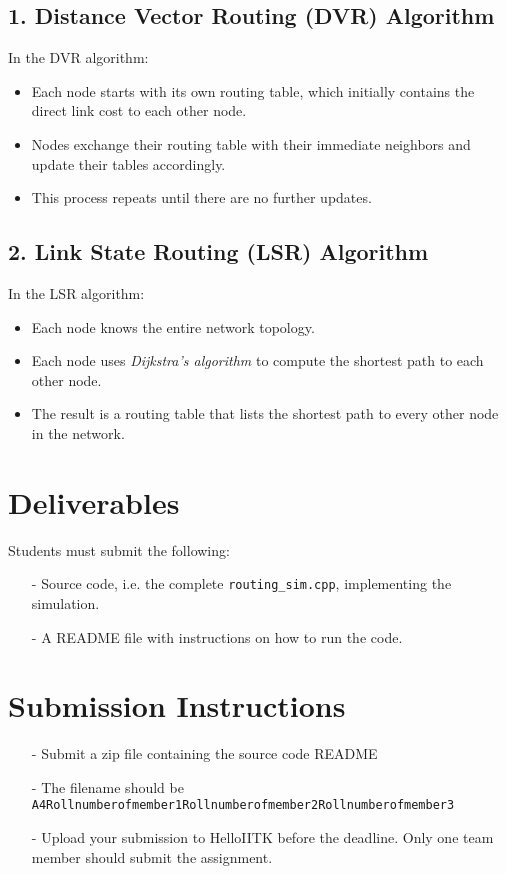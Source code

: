 \documentclass[12pt,a4paper]{article}
\begin{document}
\subsection*{1. Distance Vector Routing (DVR) Algorithm}
In the DVR algorithm:
\begin{itemize}
    \item Each node starts with its own routing table, which initially contains the direct link cost to each other node.
    \item Nodes exchange their routing table with their immediate neighbors and update their tables accordingly.
    \item This process repeats until there are no further updates.
\end{itemize}

\subsection*{2. Link State Routing (LSR) Algorithm}
In the LSR algorithm:
\begin{itemize}
    \item Each node knows the entire network topology.
    \item Each node uses \emph{Dijkstra’s algorithm} to compute the shortest path to each other node.
    \item The result is a routing table that lists the shortest path to every other node in the network.
\end{itemize}

 

 
\section*{Deliverables}
Students must submit the following:
\begin{itemize}
\item[-] Source code, i.e. the complete \texttt{routing\_sim.cpp}, implementing the simulation.
\item[-] A README file with instructions on how to run the code. 
\end{itemize}
 
 
 

 
\section*{Submission Instructions}
\begin{itemize}
\item[-] Submit a zip file containing the source code README
\item[-] The filename should be \texttt{A4Rollnumberofmember1Rollnumberofmember2Rollnumberofmember3} 
\item[-] Upload your submission to HelloIITK before the deadline. Only one team member should submit the assignment. 
\end{itemize}
\end{document}
